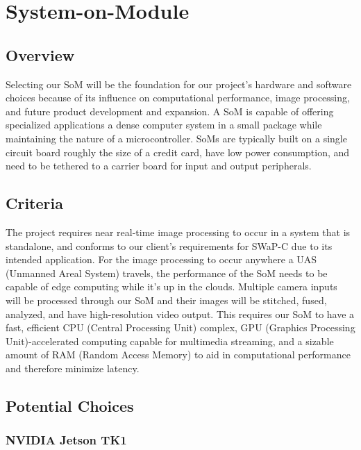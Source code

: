 \documentclass[letterpaper,10pt,serif,draftclsnofoot,onecolumn,compsoc,titlepage]{IEEEtran}
\begin{document}
\section{System-on-Module}

\subsection{Overview}

Selecting our SoM will be the foundation for our project's hardware 
and software choices because of its influence on computational performance, image 
processing, and future product development and expansion. A SoM is capable of offering 
specialized applications a dense computer system in a small package while
maintaining the nature of a microcontroller. SoMs are typically built on a single 
circuit board roughly the size of a credit card, have low power consumption, and 
need to be tethered to a carrier board for input and output peripherals.\\

\subsection{Criteria}

The project requires near real-time image processing to occur in a system that is 
standalone, and conforms to our client's requirements for SWaP-C due to its intended application. For the image processing to 
occur anywhere a UAS (Unmanned Areal System) travels, the performance of the SoM 
needs to be capable of edge computing while it's up in the clouds.
Multiple camera inputs will be processed through our SoM and their images will be 
stitched, fused, analyzed, and have high-resolution video output. This requires our 
SoM to have a fast, efficient CPU (Central Processing Unit) complex, GPU 
(Graphics Processing Unit)-accelerated computing capable for multimedia streaming, and 
a sizable amount of RAM (Random Access Memory) to aid in computational performance 
and therefore minimize latency.\\

\subsection{Potential Choices}

\subsubsection{NVIDIA Jetson TK1}
\end{document}
